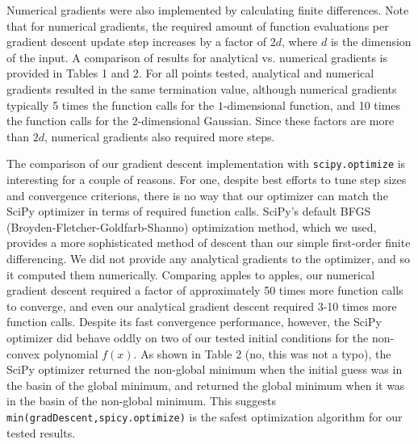 \documentclass[10pt]{article}
\begin{document}
Numerical gradients were also implemented by calculating finite differences.  Note that for numerical gradients, the required amount of function evaluations per gradient descent update step increases by a factor of $2d$, where $d$ is the dimension of the input.  A comparison of results for analytical vs. numerical gradients is provided in Tables 1 and 2.  For all points tested, analytical and numerical gradients resulted in the same termination value, although numerical gradients typically 5 times the function calls for the $1$-dimensional function, and 10 times the function calls for the $2$-dimensional Gaussian.   Since these factors are more than $2d$, numerical gradients also required more steps.

The comparison of our gradient descent implementation with \nolinkurl{scipy.optimize} is interesting for a couple of reasons.  For one, despite best efforts to tune step sizes and convergence criterions, there is no way that our optimizer can match the SciPy optimizer in terms of required function calls.  SciPy's default BFGS (Broyden-Fletcher-Goldfarb-Shanno) optimization method, which we used, provides a more sophisticated method of descent than our simple first-order finite differencing.  We did not provide any analytical gradients to the optimizer, and so it computed them numerically.  Comparing apples to apples, our numerical gradient descent required a factor of approximately 50 times more function calls to converge, and even our analytical gradient descent required 3-10 times more function calls.  Despite its fast convergence performance, however, the SciPy optimizer did behave oddly on two of our tested initial conditions for the non-convex polynomial $f(x)$.  As shown in Table 2 (no, this was not a typo), the SciPy optimizer returned the non-global minimum when the initial guess was in the basin of the global minimum, and returned the global minimum when it was in the basin of the non-global minimum.  This suggests \nolinkurl{min(gradDescent,spicy.optimize)} is the safest optimization algorithm for our tested results.
\end{document}
